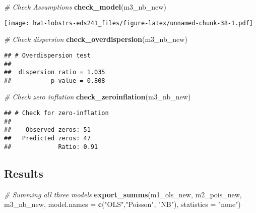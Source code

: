 \documentclass[
]{article}
\newenvironment{Shaded}{\begin{snugshade}}{\end{snugshade}}
\newcommand{\AttributeTok}[1]{\textcolor[rgb]{0.13,0.29,0.53}{#1}}
\newcommand{\CommentTok}[1]{\textcolor[rgb]{0.56,0.35,0.01}{\textit{#1}}}
\newcommand{\FunctionTok}[1]{\textcolor[rgb]{0.13,0.29,0.53}{\textbf{#1}}}
\newcommand{\NormalTok}[1]{#1}
\newcommand{\StringTok}[1]{\textcolor[rgb]{0.31,0.60,0.02}{#1}}
\begin{document}
\begin{Shaded}
\begin{Highlighting}[]
\CommentTok{\# Check Assumptions}
\FunctionTok{check\_model}\NormalTok{(m3\_nb\_new)}
\end{Highlighting}
\end{Shaded}

\texttt{[image: hw1-lobstrs-eds241\_files/figure-latex/unnamed-chunk-38-1.pdf]}

\begin{Shaded}
\begin{Highlighting}[]
\CommentTok{\# Check dispersion}
\FunctionTok{check\_overdispersion}\NormalTok{(m3\_nb\_new)}
\end{Highlighting}
\end{Shaded}

\begin{verbatim}
## # Overdispersion test
## 
##  dispersion ratio = 1.035
##           p-value = 0.808
\end{verbatim}

\begin{Shaded}
\begin{Highlighting}[]
\CommentTok{\# Check zero inflation}
\FunctionTok{check\_zeroinflation}\NormalTok{(m3\_nb\_new)}
\end{Highlighting}
\end{Shaded}

\begin{verbatim}
## # Check for zero-inflation
## 
##    Observed zeros: 51
##   Predicted zeros: 47
##             Ratio: 0.91
\end{verbatim}

\hypertarget{results}{%
\subsection{Results}\label{results}}

\begin{Shaded}
\begin{Highlighting}[]
\CommentTok{\# Summing all three models}
\FunctionTok{export\_summs}\NormalTok{(m1\_ols\_new, m2\_pois\_new, m3\_nb\_new,}
             \AttributeTok{model.names =} \FunctionTok{c}\NormalTok{(}\StringTok{"OLS"}\NormalTok{,}\StringTok{"Poisson"}\NormalTok{, }\StringTok{"NB"}\NormalTok{),}
             \AttributeTok{statistics =} \StringTok{"none"}\NormalTok{)}
\end{Highlighting}
\end{Shaded}
\end{document}
